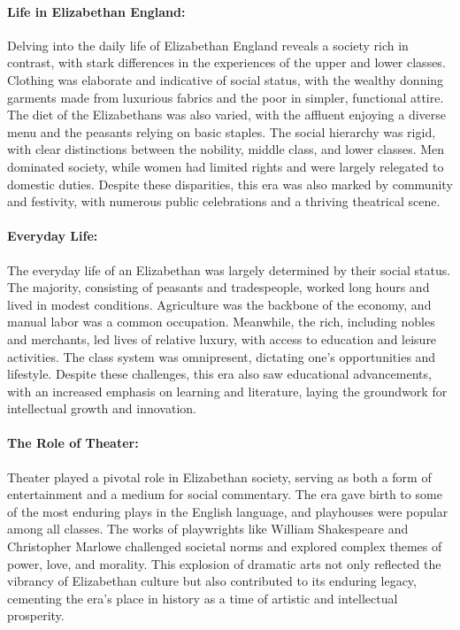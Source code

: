 \documentclass{book}
\begin{document}
\paragraph{Life in Elizabethan England:}
Delving into the daily life of Elizabethan England reveals a society rich in contrast, with stark differences in the experiences of the upper and lower classes. Clothing was elaborate and indicative of social status, with the wealthy donning garments made from luxurious fabrics and the poor in simpler, functional attire. The diet of the Elizabethans was also varied, with the affluent enjoying a diverse menu and the peasants relying on basic staples. The social hierarchy was rigid, with clear distinctions between the nobility, middle class, and lower classes. Men dominated society, while women had limited rights and were largely relegated to domestic duties. Despite these disparities, this era was also marked by community and festivity, with numerous public celebrations and a thriving theatrical scene.

\paragraph{Everyday Life:}
The everyday life of an Elizabethan was largely determined by their social status. The majority, consisting of peasants and tradespeople, worked long hours and lived in modest conditions. Agriculture was the backbone of the economy, and manual labor was a common occupation. Meanwhile, the rich, including nobles and merchants, led lives of relative luxury, with access to education and leisure activities. The class system was omnipresent, dictating one’s opportunities and lifestyle. Despite these challenges, this era also saw educational advancements, with an increased emphasis on learning and literature, laying the groundwork for intellectual growth and innovation.

\paragraph{The Role of Theater:}
Theater played a pivotal role in Elizabethan society, serving as both a form of entertainment and a medium for social commentary. The era gave birth to some of the most enduring plays in the English language, and playhouses were popular among all classes. The works of playwrights like William Shakespeare and Christopher Marlowe challenged societal norms and explored complex themes of power, love, and morality. This explosion of dramatic arts not only reflected the vibrancy of Elizabethan culture but also contributed to its enduring legacy, cementing the era’s place in history as a time of artistic and intellectual prosperity.
\end{document}
